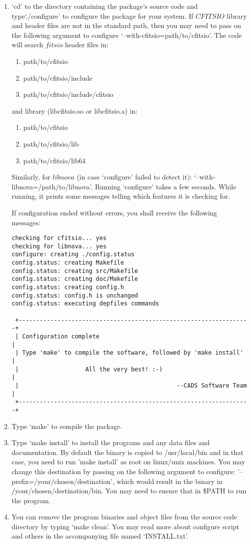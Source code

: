 \documentclass[12pt]{article}
\begin{document}
\begin{enumerate}

\item  `cd' to the directory containing the package's source code and type`./configure'
to configure the package for your system. If $CFITSIO$ library
and header files are not in the standard path, then you may need to pass on the
following argument to configure `--with-cfitsio=path/to/cfitsio'. The code will
search $fitsio$ header files in:
\begin{enumerate}
\item{path/to/cfitsio}
\item{path/to/cfitsio/include}
\item{path/to/cfitsio/include/cfitsio}
\end{enumerate}
and library (libcfitsio.so or libcfitsio.a) in:
\begin{enumerate}
\item{path/to/cfitsio}
\item{path/to/cfitsio/lib}
\item{path/to/cfitsio/lib64}
\end{enumerate}
Similarly, for $libnova$ (in case `configure' failed to detect it):
`--with-libnova=/path/to/libnova'. Running `configure' takes a
few seconds. While running, it prints some messages telling which
features it is checking for.

If configuration ended without errors, you shall receive the following messages:
\begin{verbatim}
checking for cfitsio... yes
checking for libnova... yes
configure: creating ./config.status
config.status: creating Makefile
config.status: creating src/Makefile
config.status: creating doc/Makefile
config.status: creating config.h
config.status: config.h is unchanged
config.status: executing depfiles commands

 +------------------------------------------------------------------+
 | Configuration complete                                           |
 | Type 'make' to compile the software, followed by 'make install'  |
 |                   All the very best! :-)                         |
 |                                             --CADS Software Team |
 +------------------------------------------------------------------+

\end{verbatim}
\item Type `make' to compile the package.
\item Type `make install' to install the programs and any data files and
     documentation. By default the binary is copied to /usr/local/bin and in that
     case, you need to run 'make install' as root on linux/unix machines. You may
     change this destination by passing on the following argument to configure:
'--prefix=/your/chosen/destination', which would result in the binary in
/your/chosen/destination/bin. You may need to ensure that in \$PATH to run the program.
\item You can remove the program binaries and object files from the source code
     directory by typing `make clean'. You may read more about configure script
and others in the accompanying file named `INSTALL.txt'.


\end{enumerate}
\end{document}
